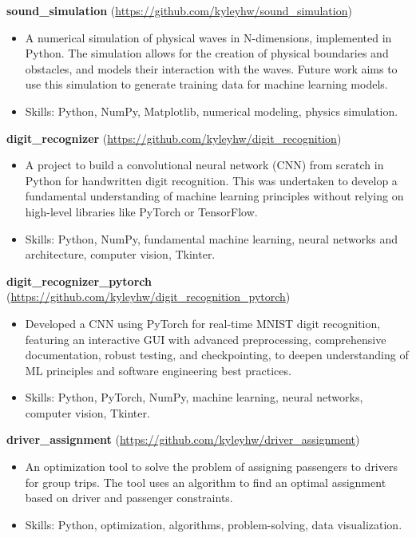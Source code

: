 \documentclass[a4paper,10pt]{extarticle}
\begin{document}
\textbf{sound\_simulation} (\url{https://github.com/kyleyhw/sound_simulation})
\begin{itemize}
    \item A numerical simulation of physical waves in N-dimensions, implemented in Python. The simulation allows for the creation of physical boundaries and obstacles, and models their interaction with the waves. Future work aims to use this simulation to generate training data for machine learning models.
    \item Skills: Python, NumPy, Matplotlib, numerical modeling, physics simulation.
\end{itemize}

\vspace{0.5em}

\textbf{digit\_recognizer} (\url{https://github.com/kyleyhw/digit_recognition})
\begin{itemize}
    \item A project to build a convolutional neural network (CNN) from scratch in Python for handwritten digit recognition. This was undertaken to develop a fundamental understanding of machine learning principles without relying on high-level libraries like PyTorch or TensorFlow.
    \item Skills: Python, NumPy, fundamental machine learning, neural networks and architecture, computer vision, Tkinter.
\end{itemize}

\vspace{0.5em}

\textbf{digit\_recognizer\_pytorch} (\url{https://github.com/kyleyhw/digit_recognition_pytorch})
\begin{itemize}
   \item Developed a CNN using PyTorch for real-time MNIST digit recognition, featuring an interactive GUI with advanced preprocessing,
     comprehensive documentation, robust testing, and checkpointing, to deepen understanding of ML principles and software engineering best
     practices.
   \item Skills: Python, PyTorch, NumPy, machine learning, neural networks, computer vision, Tkinter.
\end{itemize}

\vspace{0.5em}

\textbf{driver\_assignment} (\url{https://github.com/kyleyhw/driver_assignment})
\begin{itemize}
    \item An optimization tool to solve the problem of assigning passengers to drivers for group trips. The tool uses an algorithm to find an optimal assignment based on driver and passenger constraints.
    \item Skills: Python, optimization, algorithms, problem-solving, data visualization.
\end{itemize}
\end{document}
